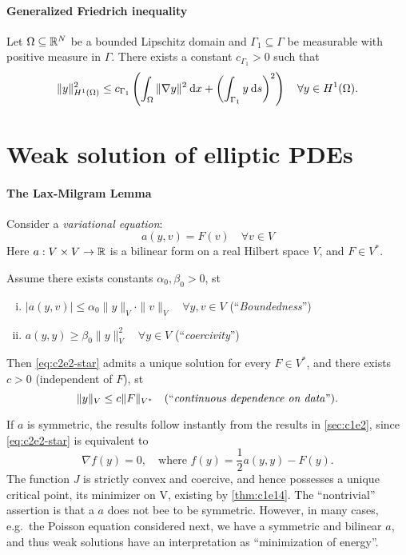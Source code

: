 \documentclass[../skript.tex]{subfiles}
\begin{document}
\paragraph{Generalized Friedrich inequality}
\begin{theorem} %
\label{thm:c2e9}
Let $\Omega \subseteq \mathbb{R}^N$ be a bounded Lipschitz domain and $\Gamma_1 \subseteq \Gamma$ be measurable with positive measure in $\Gamma$. There exists a constant $c_{\Gamma_1} > 0$ such that
\[
	\| y \|_{H^1(\Omega)}^2 \leq c_{\Gamma_1} \left( \int_\Omega \| \nabla y \|^2 \:\mathrm{d}x + \left( \int_{\Gamma_1} y \:\mathrm{d}s \right)^2 \right) \quad \forall y \in H^1(\Omega).
\]
\end{theorem}
\section{Weak solution of elliptic PDEs} %
\label{sec:c2e2}
\paragraph{The Lax-Milgram Lemma}
Consider a \emph{variational equation}:
\begin{equation}
\label{eq:c2e2-star}
	\boxed{a(y, v) = F(v) \quad \forall v \in V}
	\tag{$\star$}
\end{equation}
Here $a : V \times V \to \mathbb{R}$ is a bilinear form on a real Hilbert space $V$, and $F \in V^*$.
\begin{theorem} %
\label{thm:c2e10}
Assume there exists constants $\alpha_0, \beta_0 > 0$, \ac{st}
\begin{enumerate}[(i)]
\item $|a(y, v)| \leq \alpha_0 \| y \|_V \cdot \| v \|_V \quad \forall y, v \in V$ (``\emph{Boundedness}'')
\item $a(y,y) \geq \beta_0 \| y \|_V^2 \quad \forall y \in V$ (``\emph{coercivity}'')
\end{enumerate}
Then \cref{eq:c2e2-star} admits a unique solution for every $F \in V^*$, and there exists $c > 0$ (independent of $F$), \ac{st}
\[
	\| y \|_V \leq c \| F \|_{V^*} \quad \text{(``\emph{continuous dependence on data}'')}.
\]
\end{theorem}
\begin{remark} %
\label{rem:c2e11}
If $a$ is symmetric, the results follow instantly from the results in \cref{sec:c1e2}, since \cref{eq:c2e2-star} is equivalent to
\[
	\nabla f(y) = 0, \quad \text{where } f(y) = \frac{1}{2} a(y, y) - F(y).
\]
The function $J$ is strictly convex and coercive, and hence possesses a unique critical point, its minimizer on V, existing by \cref{thm:c1e14}.
The ``nontrivial'' assertion is that a $a$ does not bee to be symmetric.
However, in many cases, e.g.\ the Poisson equation considered next, we have a symmetric and bilinear $a$, and thus weak solutions have an interpretation as ``minimization of energy''. 
\end{remark}
\end{document}
